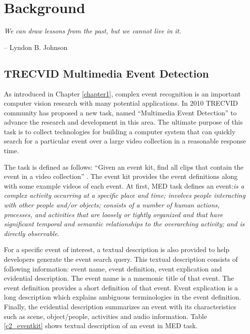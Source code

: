 \chapter{Background}
\label{chapter2}
\epigraph{\textit{We can draw lessons from the past, but we cannot live in it.}}{ -- Lyndon B. Johnson}

\ifpdf
    \graphicspath{{Chapter2/Figs/Raster/}{Chapter2/Figs/PDF/}{Chapter2/Figs/}}
\else
    \graphicspath{{Chapter2/Figs/Vector/}{Chapter2/Figs/}}
\fi


\section{TRECVID Multimedia Event Detection}

As introduced in Chapter \ref{chapter1}, complex event recognition is an important computer vision research with many potential applications. In 2010 TRECVID community has proposed a new task, named ``Multimedia Event Detection'' \cite{over2011trecvid} to advance the research and development in this area. The ultimate purpose of this task is to collect technologies for building a computer system that can quickly search for a particular event over a large video collection in a reasonable response time.  
 
The task is defined as follows: ``Given an event kit, find all clips that contain the event in a video collection'' \cite{over2011trecvid}. The event kit provides the event definitions along with some example videos of each event. At first, MED task defines an event:\textit{is a complex activity occurring at a specific place and time; involves people interacting with other people and/or objects; consists of a number of human actions, processes, and activities that are loosely or tightly organized and that have significant temporal and semantic relationships to the overarching activity; and is directly observable}. 

For a specific event of interest, a textual description is also provided to help developers generate the event search query. This textual description consists of following information: event name, event definition, event explication and evidential description. The event name is a mnemonic title of that event. The event definition provides a short definition of that event. Event explication is a long description which explains ambiguous terminologies in the event definition. Finally, the evidential description summarizes an event with its characteristics such as scene, object/people, activities and audio information. Table \ref{c2_eventkit} shows textual description of an event in MED task.

